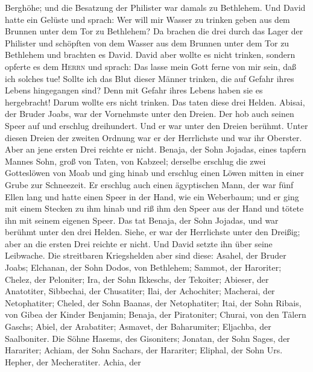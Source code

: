 Berghöhe; und die Besatzung der Philister war damals zu Bethlehem.
 Und David hatte ein Gelüste und sprach: Wer will mir
Wasser zu trinken geben aus dem Brunnen unter dem Tor zu Bethlehem?
 Da brachen die drei durch das Lager der Philister und
schöpften von dem Wasser aus dem Brunnen unter dem Tor zu Bethlehem und
brachten es David. David aber wollte es nicht trinken, sondern opferte
es dem \textsc{Herrn} und sprach:  Das lasse mein Gott
ferne von mir sein, daß ich solches tue! Sollte ich das Blut dieser
Männer trinken, die auf Gefahr ihres Lebens hingegangen sind? Denn mit
Gefahr ihres Lebens haben sie es hergebracht! Darum wollte
er\textquotesingle s nicht trinken. Das taten diese drei Helden.
 Abisai, der Bruder Joabs, war der Vornehmste unter den
Dreien. Der hob auch seinen Speer auf und erschlug dreihundert. Und er
war unter den Dreien berühmt.  Unter diesen Dreien der
zweiten Ordnung war er der Herrlichste und war ihr Oberster. Aber an
jene ersten Drei reichte er nicht.  Benaja, der Sohn
Jojadas, eines tapfern Mannes Sohn, groß von Taten, von Kabzeel;
derselbe erschlug die zwei Gotteslöwen von Moab und ging hinab und
erschlug einen Löwen mitten in einer Grube zur Schneezeit.
 Er erschlug auch einen ägyptischen Mann, der war fünf
Ellen lang und hatte einen Speer in der Hand, wie ein Weberbaum; und er
ging mit einem Stecken zu ihm hinab und riß ihm den Speer aus der Hand
und tötete ihn mit seinem eigenen Speer.  Das tat Benaja,
der Sohn Jojadas, und war berühmt unter den drei Helden. 
Siehe, er war der Herrlichste unter den Dreißig; aber an die ersten Drei
reichte er nicht. Und David setzte ihn über seine Leibwache.
 Die streitbaren Kriegshelden aber sind diese: Asahel,
der Bruder Joabs; Elchanan, der Sohn Dodos, von Bethlehem;
 Sammot, der Haroriter; Chelez, der Peloniter;
 Ira, der Sohn Ikkeschs, der Tekoiter; Abieser, der
Anatotiter,  Sibbechai, der Chusatiter; Ilai, der
Achochiter;  Macherai, der Netophatiter; Cheled, der Sohn
Baanas, der Netophatiter;  Itai, der Sohn Ribais, von
Gibea der Kinder Benjamin; Benaja, der Piratoniter; 
Churai, von den Tälern Gaschs; Abiel, der Arabatiter; 
Asmavet, der Baharumiter; Eljachba, der Saalboniter.  Die
Söhne Hasems, des Gisoniters; Jonatan, der Sohn Sages, der Harariter;
 Achiam, der Sohn Sachars, der Harariter; Eliphal, der
Sohn Urs.  Hepher, der Mecheratiter. Achia, der
